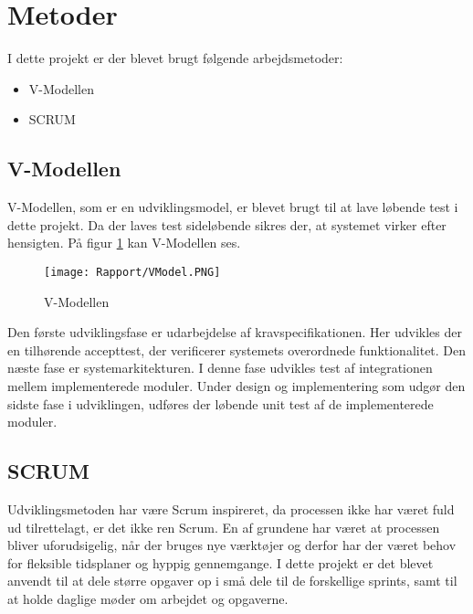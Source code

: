 \section{Metoder}

I dette projekt er der blevet brugt følgende arbejdsmetoder:
\begin{itemize}
	\item V-Modellen
	\item SCRUM
	
\end{itemize}

\subsection{V-Modellen}

V-Modellen, som er en udviklingsmodel, er blevet brugt til at lave løbende test i dette projekt. Da der laves test sideløbende sikres der, at systemet virker efter hensigten. På figur \ref{VModel} kan V-Modellen ses.

\begin{figure}[H]
	\centering
	\texttt{[image: Rapport/VModel.PNG]}
	\caption{V-Modellen}
	\label{VModel}
\end{figure} 
Den første udviklingsfase er udarbejdelse af kravspecifikationen. Her udvikles der en tilhørende accepttest, der verificerer systemets overordnede funktionalitet. Den næste fase er systemarkitekturen.
I denne fase udvikles test af integrationen mellem implementerede moduler. Under design og implementering som udgør den sidste fase i udviklingen, udføres der løbende unit test af de implementerede moduler.

\subsection{SCRUM}
Udviklingsmetoden har være Scrum inspireret, da processen ikke har været fuld ud tilrettelagt, er det ikke ren Scrum. En af grundene har været at processen bliver uforudsigelig, når der bruges nye værktøjer og derfor har der været behov for fleksible tidsplaner og hyppig gennemgange. 
\newline
\newline
I dette projekt er det blevet anvendt til at dele større opgaver op i små dele til de forskellige sprints, samt til at holde daglige møder om arbejdet og opgaverne. 


